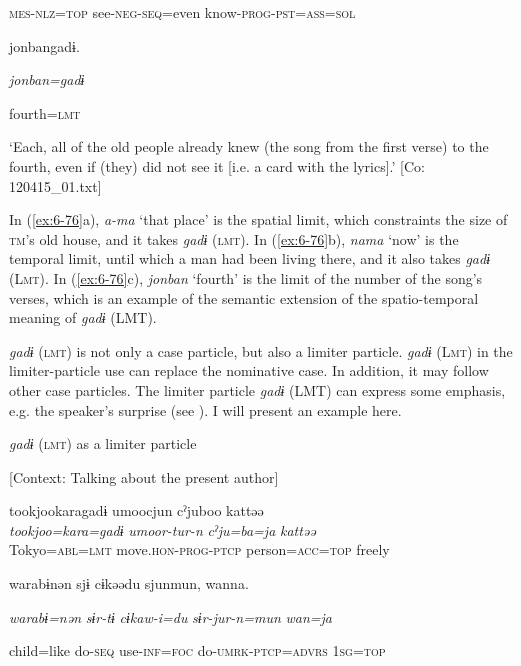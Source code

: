 \begin{table}
    \textsc{mes}-\textsc{nlz}=\textsc{top}  see-\textsc{neg}-\textsc{seq}=even  know-\textsc{prog}-\textsc{pst}=\textsc{ass}=\textsc{sol}

    {\textbar}jonban{\textbar}gadɨ.

    \textit{jonban=gadɨ}

    fourth=\textsc{lmt}

\glt    ‘Each, all of the old people already knew (the song from the first verse) to the fourth, even if (they) did not see it [i.e. a card with the lyrics].’ [Co: 120415\_01.txt]
\z

In (\ref{ex:6-76}a), \textit{a-ma} ‘that place’ is the spatial limit, which constraints the size of \textsc{tm}’s old house, and it takes \textit{gadɨ} (\textsc{lmt}). In (\ref{ex:6-76}b), \textit{nama} ‘now’ is the temporal limit, until which a man had been living there, and it also takes \textit{gadɨ} (L\textsc{mt}). In (\ref{ex:6-76}c), \textit{jonban} ‘fourth’ is the limit of the number of the song’s verses, which is an example of the semantic extension of the spatio-temporal meaning of \textit{gadɨ} (LMT).

\textit{gadɨ} (\textsc{lmt}) is not only a case particle, but also a limiter particle. \textit{gadɨ} (L\textsc{mt}) in the limiter-particle use can replace the nominative case. In addition, it may follow other case particles. The limiter particle \textit{gadɨ} (LMT) can express some emphasis, e.g. the speaker’s surprise (see ). I will present an example here.

\ea\label{ex:6-77}
  \textit{gadɨ} (\textsc{lmt}) as a limiter particle

  [Context: Talking about the present author]

{\TM}
\glll tookjookaragadɨ  umoocjun  cˀjuboo  kattəə\\
\textit{tookjoo=kara=gadɨ}  \textit{umoor-tur-n}  \textit{cˀju=ba=ja}  \textit{kattəə}\\

    Tokyo=\textsc{abl}=\textsc{lmt}  move.\textsc{hon}-\textsc{prog}-\textsc{ptcp}  person=\textsc{acc}=\textsc{top}  freely

    warabɨnən  sjɨ  cɨkəədu  sjunmun,  wanna.

    \textit{warabɨ=nən}  \textit{sɨr-tɨ}  \textit{cɨkaw-i=du}  \textit{sɨr-jur-n=mun}  \textit{wan=ja}

    child=like  do-\textsc{seq}  use-\textsc{inf}=\textsc{foc}  do-\textsc{umrk}-\textsc{ptcp}=\textsc{advrs}  1\textsc{sg}=\textsc{top}


\end{table}

